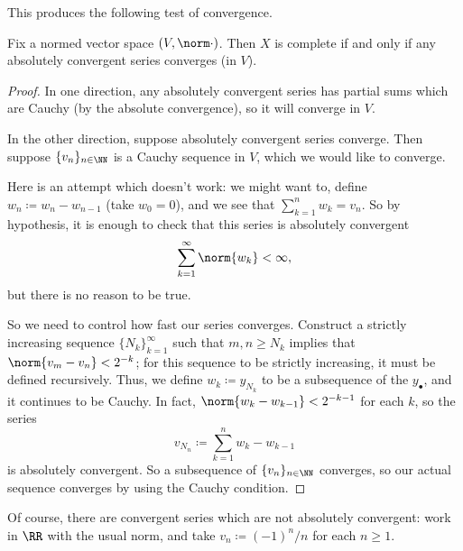 \documentclass[../notes.tex]{subfiles}
\begin{document}
This produces the following test of convergence.
\begin{lemma}
	Fix a normed vector space $(V,\norm\cdot)$. Then $X$ is complete if and only if any absolutely convergent series converges (in $V$).
\end{lemma}
\begin{proof}
	In one direction, any absolutely convergent series has partial sums which are Cauchy (by the absolute convergence), so it will converge in $V$.

	In the other direction, suppose absolutely convergent series converge. Then suppose $\{v_n\}_{n\in\NN}$ is a Cauchy sequence in $V$, which we would like to converge.
	\begin{remark}
		Here is an attempt which doesn't work: we might want to, define $w_n\coloneqq w_n-w_{n-1}$ (take $w_0=0$), and we see that $\sum_{k=1}^nw_k=v_n$. So by hypothesis, it is enough to check that this series is absolutely convergent
		\[\sum_{k=1}^\infty\norm{w_k}<\infty,\]
		but there is no reason to be true.
	\end{remark}
	So we need to control how fast our series converges. Construct a strictly increasing sequence $\{N_k\}_{k=1}^\infty$ such that $m,n\ge N_k$ implies that $\norm{v_m-v_n}<2^{-k}$; for this sequence to be strictly increasing, it must be defined recursively. Thus, we define $w_k\coloneqq y_{N_k}$ to be a subsequence of the $y_\bullet$, and it continues to be Cauchy. In fact, $\norm{w_k-w_{k-1}}<2^{-k-1}$ for each $k$, so the series
	\[v_{N_n}\coloneqq\sum_{k=1}^nw_k-w_{k-1}\]
	is absolutely convergent. So a subsequence of $\{v_n\}_{n\in\NN}$ converges, so our actual sequence converges by using the Cauchy condition.
\end{proof}
\begin{remark}
	Of course, there are convergent series which are not absolutely convergent: work in $\RR$ with the usual norm, and take $v_n\coloneqq(-1)^n/n$ for each $n\ge1$.
\end{remark}
\end{document}
